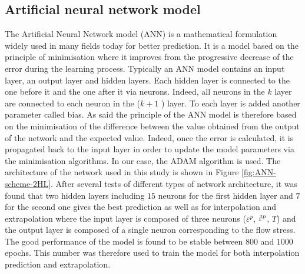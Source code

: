 \documentclass[twoside,english,1p,final,sort&compress]{elsarticle}
\theoremstyle{plain}
\newcommand{\mdot}[1]{\accentset{\mbox{\bfseries .}}{#1}}
\begin{document}
\subsection{Artificial neural network model\label{sec:ANNmodel}}
The Artificial Neural Network model (ANN) is a mathematical formulation widely used in many fields today for better prediction. It is a model based on the principle of minimisation where it improves from the progressive decrease of the error during the learning process. Typically an ANN model contains an input layer, an output layer and hidden layers. Each hidden layer is connected to the one before it and the one after it via neurons. Indeed, all neurons in the $k$ layer are connected to each neuron in the ($k+1$ ) layer. To each layer is added another parameter called bias. As said the principle of the ANN model is therefore based on the minimisation of the difference between the value obtained from the output of the network and the expected value.  Indeed, once the error is calculated, it is propagated back to the input layer in order to update the model parameters via the minimisation algorithms. In our case, the ADAM algorithm is used. The architecture of the network used in this study is shown in Figure \ref{fig:ANN-scheme-2HL}. After several tests of different types of network architecture, it was found that two hidden layers including $15$ neurons for the first hidden layer and $7$ for the second one gives the best prediction as well as for interpolation and extrapolation where the input layer is composed of three neurons ($\varepsilon^p$, $\mdot{\varepsilon}^p$, $T$) and the output layer is composed of a single neuron corresponding to the flow stress. The good performance of the model is found to be stable between $800$ and $1000$ epochs. This number was therefore used to train the model for both interpolation prediction and extrapolation. 
\end{document}

